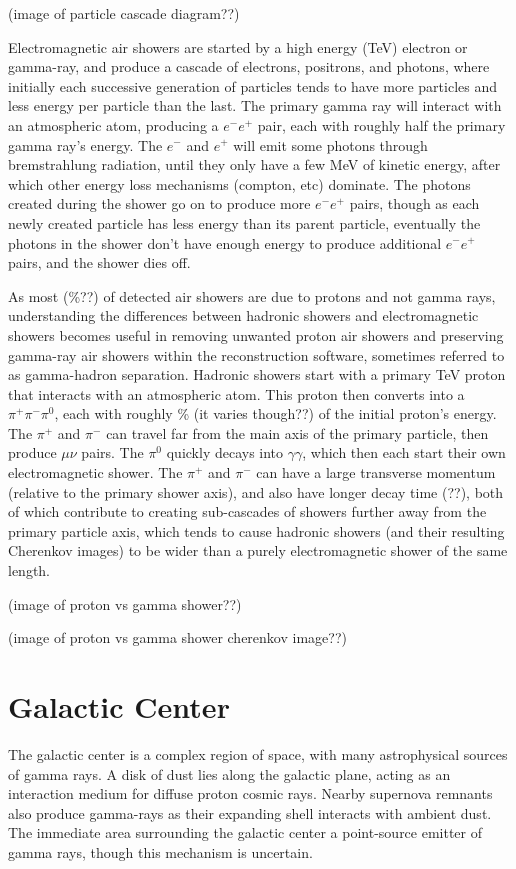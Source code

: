(image of particle cascade diagram??)

Electromagnetic air showers are started by a high energy (\nicetilde TeV) electron or gamma-ray, and produce a cascade of electrons, positrons, and photons, where initially each successive generation of particles tends to have more particles and less energy per particle than the last.
The primary gamma ray will interact with an atmospheric atom, producing a $e^{-}e^{+}$ pair, each with roughly half the primary gamma ray's energy.
The $e^{-}$ and $e^{+}$ will emit some photons through bremstrahlung radiation, until they only have a few MeV of kinetic energy, after which other energy loss mechanisms (compton, etc) dominate.
The photons created during the shower go on to produce more $e^{-}e^{+}$ pairs, though as each newly created particle has less energy than its parent particle, eventually the photons in the shower don't have enough energy to produce additional $e^{-}e^{+}$ pairs, and the shower dies off.

As most (\%??) of detected air showers are due to protons and not gamma rays, understanding the differences between hadronic showers and electromagnetic showers becomes useful in removing unwanted proton air showers and preserving gamma-ray air showers within the reconstruction software, sometimes referred to as gamma-hadron separation.
Hadronic showers start with a primary \nicetilde TeV proton that interacts with an atmospheric atom.
This proton then converts into a $\pi^{+}\pi^{-}\pi^{0}$, each with roughly \% (it varies though??) of the initial proton's energy.
The $\pi^{+}$ and $\pi^{-}$ can travel far from the main axis of the primary particle, then produce $\mu\nu$ pairs.
The $\pi^{0}$ quickly decays into $\gamma\gamma$, which then each start their own electromagnetic shower.
The $\pi^{+}$ and $\pi^{-}$ can have a large transverse momentum (relative to the primary shower axis), and also have longer decay time (??), both of which contribute to creating sub-cascades of showers further away from the primary particle axis, which tends to cause hadronic showers (and their resulting Cherenkov images) to be wider than a purely electromagnetic shower of the same length. 

(image of proton vs gamma shower??)

(image of proton vs gamma shower cherenkov image??)


\section{Galactic Center}
The galactic center is a complex region of space, with many astrophysical sources of gamma rays.
A disk of dust lies along the galactic plane, acting as an interaction medium for diffuse proton cosmic rays.
Nearby supernova remnants also produce gamma-rays as their expanding shell interacts with ambient dust.
The immediate area surrounding the galactic center a point-source emitter of gamma rays, though this mechanism is uncertain.

